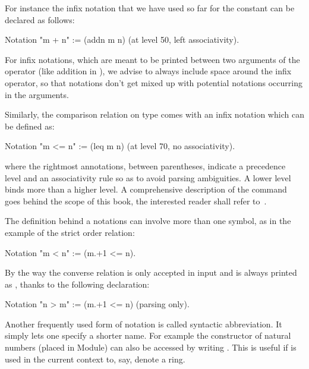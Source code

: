 For instance the infix notation that we have used so far for the
constant  can be declared as follows:

\begin{coq}{}{}
Notation "m + n" := (addn m n) (at level 50, left associativity).
\end{coq}

For infix notations, which are meant to be printed between two arguments
of the operator (like addition in ), we advise to always include
space around the infix operator, so that notations don't get mixed up with
potential notations occurring in the arguments.


Similarly, the comparison relation  on type  comes with
an infix notation \C{<=} which can be defined as:

\begin{coq}{}{}
Notation "m <= n" := (leq m n) (at level 70, no associativity).
\end{coq}

where the rightmost annotations, between parentheses, indicate a
precedence level and an associativity rule so as to avoid parsing
ambiguities. A lower level binds more than a higher level. A comprehensive
description of the  command goes behind the scope of this
book, the interested reader shall refer to~\cite[Chapter 12]{Coq:manual}.

The definition behind a notations can involve more than one symbol,
as in the example of the strict order relation:


\begin{coq}{}{}
Notation "m < n"  := (m.+1 <= n).
\end{coq}


By the way the converse relation  is only accepted in input
and is always printed as  , thanks to the following declaration:

\begin{coq}{}{}
Notation "n > m"  := (m.+1 <= n) (parsing only).
\end{coq}

Another frequently used form of notation is called syntactic abbreviation.
It simply lets one specify a shorter name.  For example the  constructor
of natural numbers (placed in  Module) can also be accessed
by writing .  This is useful if  is used in the current context
to, say, denote a ring.

